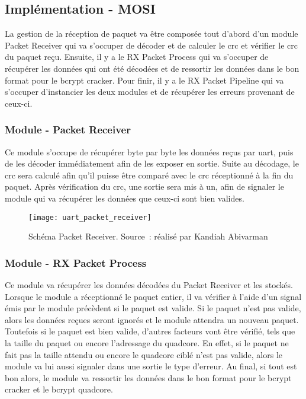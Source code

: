 \subsection{Implémentation - MOSI}

La gestion de la réception de paquet va être composée tout d’abord d’un module Packet Receiver qui va s’occuper de décoder et de calculer le \gls{crc} et vérifier le \gls{crc} du paquet reçu. 
Ensuite, il y a le RX Packet Process qui va s’occuper de récupérer les données qui ont été décodées et de ressortir les données dans le bon format pour le bcrypt cracker. 
Pour finir, il y a le RX Packet Pipeline qui va s’occuper d’instancier les deux modules et de récupérer les erreurs provenant de ceux-ci.

\subsubsection{Module - Packet Receiver}

Ce module s'occupe de récupérer byte par byte les données reçus par \gls{uart}, puis de les décoder immédiatement afin de les exposer en sortie.
Suite au décodage, le \gls{crc} sera calculé afin qu'il puisse être comparé avec le \gls{crc} réceptionné à la fin du paquet.
Après vérification du \gls{crc}, une sortie sera mis à un, afin de signaler le module qui va récupérer les données que ceux-ci sont bien valides.

\begin{figure}[tbph!]
	\centering
	\texttt{[image: uart\_packet\_receiver]}
	\caption[Schéma Packet Receiver]{Schéma Packet Receiver. Source : réalisé par Kandiah Abivarman}
	\label{fig:uart_packet_receiver}
\end{figure}


\subsubsection{Module - RX Packet Process}

Ce module va récupérer les données décodées du Packet Receiver et les stockés.
Lorsque le module a réceptionné le paquet entier, il va vérifier à l'aide d'un signal émis par le module précèdent si le paquet est valide.
Si le paquet n'est pas valide, alors les données reçues seront ignorés et le module attendra un nouveau paquet.
Toutefois si le paquet est bien valide, d'autres facteurs vont être vérifié, tels que la taille du paquet ou encore l'adressage du quadcore.
En effet, si le paquet ne fait pas la taille attendu ou encore le quadcore ciblé n'est pas valide, alors le module va lui aussi signaler dans une sortie le type d'erreur.
Au final, si tout est bon alors, le module va ressortir les données dans le bon format pour le bcrypt cracker et le bcrypt quadcore.

